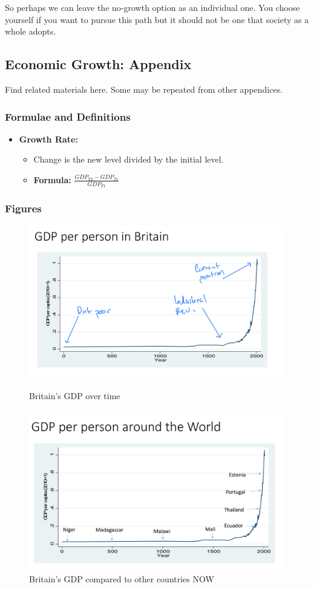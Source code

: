 \documentclass[12pt, letterpaper]{article}
\begin{document}
So perhaps we can leave the no-growth option as an individual one. You choose yourself if you want to pursue this path but it should not be one that society as a whole adopts.

\subsection{Economic Growth: Appendix}
Find related materials here. Some may be repeated from other appendices.
\subsubsection{Formulae and Definitions}
\begin{itemize}
	\item \textbf{Growth Rate:}
		\begin{itemize}
			\item Change is the new level divided by the initial level.
			\item \textbf{Formula:} $\frac{GDP_{T2} - GDP_{T1}}{GDP_{T1}}$
		\end{itemize}
\end{itemize}

\subsubsection{Figures}

\begin{figure}[h]
\centering
	\begin{minipage}{0.45\textwidth}
		\centering
		\includegraphics[width=.7\textwidth]{britain_gdp_1}
		\caption{Britain's GDP over time}
		\label{fig:britain_gdp_1}
	\end{minipage}\hfill
	\begin{minipage}{0.45\textwidth}
		\centering
		\includegraphics[width=.7\textwidth]{britain_gdp_2}
		\caption{Britain's GDP compared to other countries NOW}
		\label{fig:britain_gdp_2}
	\end{minipage}
\end{figure}	
	
\end{document}
